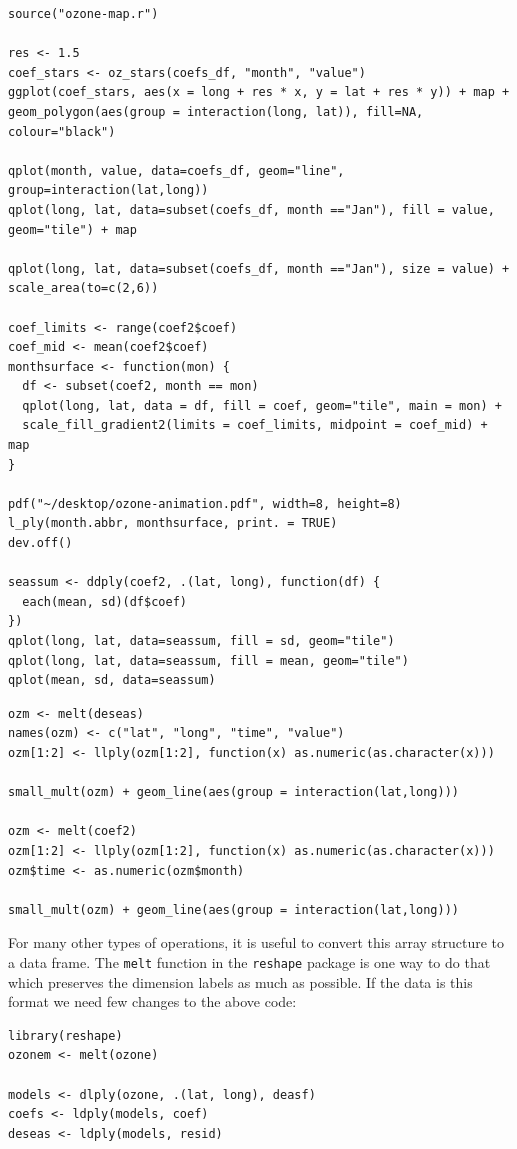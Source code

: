 \documentclass{scrartcl}
\begin{document}
\begin{verbatim}
source("ozone-map.r")

res <- 1.5
coef_stars <- oz_stars(coefs_df, "month", "value")
ggplot(coef_stars, aes(x = long + res * x, y = lat + res * y)) + map + geom_polygon(aes(group = interaction(long, lat)), fill=NA, colour="black")

qplot(month, value, data=coefs_df, geom="line", group=interaction(lat,long))
qplot(long, lat, data=subset(coefs_df, month =="Jan"), fill = value, 
geom="tile") + map

qplot(long, lat, data=subset(coefs_df, month =="Jan"), size = value) + scale_area(to=c(2,6))

coef_limits <- range(coef2$coef)
coef_mid <- mean(coef2$coef)
monthsurface <- function(mon) {
  df <- subset(coef2, month == mon)
  qplot(long, lat, data = df, fill = coef, geom="tile", main = mon) + 
  scale_fill_gradient2(limits = coef_limits, midpoint = coef_mid) + map
}

pdf("~/desktop/ozone-animation.pdf", width=8, height=8)
l_ply(month.abbr, monthsurface, print. = TRUE)
dev.off()

seassum <- ddply(coef2, .(lat, long), function(df) {
  each(mean, sd)(df$coef)
})
qplot(long, lat, data=seassum, fill = sd, geom="tile")
qplot(long, lat, data=seassum, fill = mean, geom="tile")
qplot(mean, sd, data=seassum)
\end{verbatim}

\begin{verbatim}
ozm <- melt(deseas)
names(ozm) <- c("lat", "long", "time", "value")
ozm[1:2] <- llply(ozm[1:2], function(x) as.numeric(as.character(x)))

small_mult(ozm) + geom_line(aes(group = interaction(lat,long)))

ozm <- melt(coef2)
ozm[1:2] <- llply(ozm[1:2], function(x) as.numeric(as.character(x)))
ozm$time <- as.numeric(ozm$month)

small_mult(ozm) + geom_line(aes(group = interaction(lat,long)))

\end{verbatim}

For many other types of operations, it is useful to convert this array structure to a data frame.  The {\tt melt} function in the {\tt reshape} package is one way to do that which preserves the dimension labels as much as possible.  If the data is this format we need few changes to the above code:

\begin{verbatim}
library(reshape)
ozonem <- melt(ozone)

models <- dlply(ozone, .(lat, long), deasf)
coefs <- ldply(models, coef)
deseas <- ldply(models, resid)

\end{verbatim}
\end{document}
